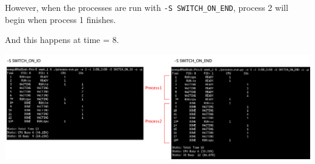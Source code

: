 \documentclass[12pt]{article}
\begin{document}
\begin{enumerate}[1.]
\begin{itemize}
\begin{itemize}
            \bigskip

            However, when the processes are run with \texttt{-S SWITCH\_ON\_END}, process 2 will begin when
            process 1 finishes.

            \bigskip

            And this happens at time = 8.

            \bigskip

            \begin{center}
            \includegraphics[width=\linewidth]{images/worksheet_1_solution_9.png}
            \end{center}

        \end{itemize}
    \end{itemize}

\end{enumerate}
\end{document}

